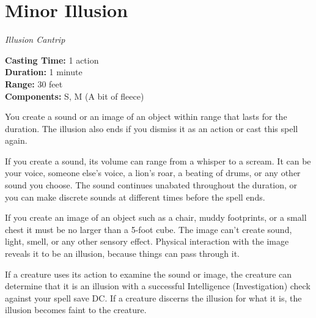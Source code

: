 \documentclass[twocolumn,lettersize]{article}
\begin{document}
  
    {
  

  \section*{Minor Illusion}

    \textit{Illusion Cantrip} %
             
  \noindent
  \textbf{Casting Time:} 1 action \\
  \textbf{Duration:} 1 minute\\
  \textbf{Range:} 30 feet \\
  \textbf{Components:} S, M (A bit of fleece) 

  You create a sound or an image of an object within range that lasts for the 
    duration. The illusion also ends if you dismiss it as an action or cast this 
    spell again.
    
    If you create a sound, its volume can range from a whisper to a 
    scream. It can be your voice, someone else's voice, a lion's roar, a beating of 
    drums, or any other sound you choose. The sound continues unabated throughout 
    the duration, or you can make discrete sounds at different times before the 
    spell ends.
    
    If you create an image of an object such as a chair, muddy 
    footprints, or a small chest it must be no larger than a 5-foot cube. The image 
    can't create sound, light, smell, or any other sensory effect. Physical 
    interaction with the image reveals it to be an illusion, because things can pass
     through it.
    
    If a creature uses its action to examine the sound or image, the 
    creature can determine that it is an illusion with a successful Intelligence 
    (Investigation) check against your spell save DC. If a creature discerns the 
    illusion for what it is, the illusion becomes faint to the creature.
    

  } %
\end{document}
